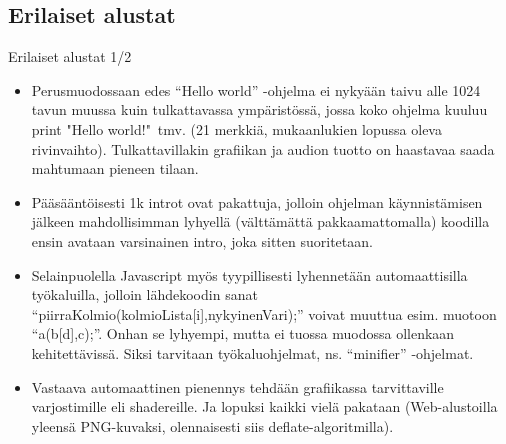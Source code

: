 \documentclass[pdf,10pt]{beamer}
\begin{document}
\subsection{Erilaiset alustat}
\begin{frame}{Erilaiset alustat 1/2}
  \begin{itemize}
    \item Perusmuodossaan edes ``Hello world'' -ohjelma ei nykyään
      taivu alle 1024 tavun muussa kuin tulkattavassa ympäristössä,
      jossa koko ohjelma kuuluu print "Hello world!"\ tmv. (21
      merkkiä, mukaanlukien lopussa oleva
      rivinvaihto). Tulkattavillakin grafiikan ja audion tuotto on
      haastavaa saada mahtumaan pieneen tilaan.
    \item Pääsääntöisesti 1k introt ovat pakattuja, jolloin ohjelman
      käynnistämisen jälkeen mahdollisimman lyhyellä (välttämättä
      pakkaamattomalla) koodilla ensin avataan varsinainen intro, joka
      sitten suoritetaan.
    \item Selainpuolella Javascript myös tyypillisesti lyhennetään
      automaattisilla työkaluilla, jolloin lähdekoodin sanat
      ``piirraKolmio(kolmioLista[i],nykyinenVari);'' voivat muuttua
      esim. muotoon ``a(b[d],c);''. Onhan se lyhyempi, mutta ei tuossa
      muodossa ollenkaan kehitettävissä. Siksi tarvitaan
      työkaluohjelmat, ns. ``minifier'' -ohjelmat.
    \item Vastaava automaattinen pienennys tehdään grafiikassa
      tarvittaville varjostimille eli shadereille. Ja lopuksi kaikki
      vielä pakataan (Web-alustoilla yleensä PNG-kuvaksi, olennaisesti
      siis deflate-algoritmilla).
  \end{itemize}
\end{frame}
\end{document}
